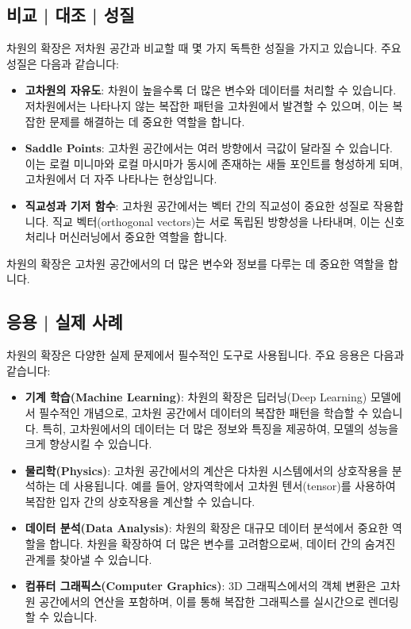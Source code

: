 \subsection{비교 | 대조 | 성질}
차원의 확장은 저차원 공간과 비교할 때 몇 가지 독특한 성질을 가지고 있습니다. 주요 성질은 다음과 같습니다:

\begin{itemize}
  \item \textbf{고차원의 자유도}: 차원이 높을수록 더 많은 변수와 데이터를 처리할 수 있습니다. 저차원에서는 나타나지 않는 복잡한 패턴을 고차원에서 발견할 수 있으며, 이는 복잡한 문제를 해결하는 데 중요한 역할을 합니다.

  \item \textbf{Saddle Points}: 고차원 공간에서는 여러 방향에서 극값이 달라질 수 있습니다. 이는 로컬 미니마와 로컬 마시마가 동시에 존재하는 새들 포인트를 형성하게 되며, 고차원에서 더 자주 나타나는 현상입니다.

  \item \textbf{직교성과 기저 함수}: 고차원 공간에서는 벡터 간의 직교성이 중요한 성질로 작용합니다. 직교 벡터(orthogonal vectors)는 서로 독립된 방향성을 나타내며, 이는 신호 처리나 머신러닝에서 중요한 역할을 합니다.
\end{itemize}

\vspace{1\baselineskip}
\noindent 차원의 확장은 고차원 공간에서의 더 많은 변수와 정보를 다루는 데 중요한 역할을 합니다.

\subsection{응용 | 실제 사례}
차원의 확장은 다양한 실제 문제에서 필수적인 도구로 사용됩니다. 주요 응용은 다음과 같습니다:

\begin{itemize}
  \item \textbf{기계 학습(Machine Learning)}: 차원의 확장은 딥러닝(Deep Learning) 모델에서 필수적인 개념으로, 고차원 공간에서 데이터의 복잡한 패턴을 학습할 수 있습니다. 특히, 고차원에서의 데이터는 더 많은 정보와 특징을 제공하여, 모델의 성능을 크게 향상시킬 수 있습니다.

  \item \textbf{물리학(Physics)}: 고차원 공간에서의 계산은 다차원 시스템에서의 상호작용을 분석하는 데 사용됩니다. 예를 들어, 양자역학에서 고차원 텐서(tensor)를 사용하여 복잡한 입자 간의 상호작용을 계산할 수 있습니다.

  \item \textbf{데이터 분석(Data Analysis)}: 차원의 확장은 대규모 데이터 분석에서 중요한 역할을 합니다. 차원을 확장하여 더 많은 변수를 고려함으로써, 데이터 간의 숨겨진 관계를 찾아낼 수 있습니다.

  \item \textbf{컴퓨터 그래픽스(Computer Graphics)}: 3D 그래픽스에서의 객체 변환은 고차원 공간에서의 연산을 포함하며, 이를 통해 복잡한 그래픽스를 실시간으로 렌더링할 수 있습니다.
\end{itemize}

